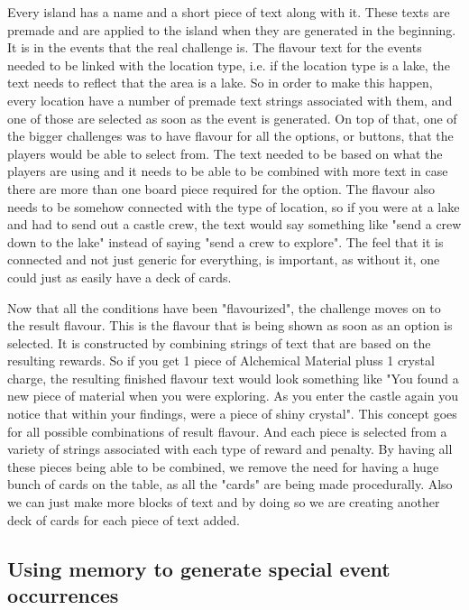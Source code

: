 Every island has a name and a short piece of text along with it. These texts are premade and are applied to the island when they are generated in the beginning. 
It is in the events that the real challenge is. The flavour text for the events needed to be linked with the location type, i.e. if the location type is a lake, the text needs to reflect that the area is a lake. So in order to make this happen, every location have a number of premade text strings associated with them, and one of those are selected as soon as the event is generated. On top of that, one of the bigger challenges was to have flavour for all the options, or buttons, that the players would be able to select from. The text needed to be based on what the players are using and it needs to be able to be combined with more text in case there are more than one board piece required for the option. The flavour also needs to be somehow connected with the type of location, so if you were at a lake and had to send out a castle crew, the text would say something like "send a crew down to the lake" instead of saying "send a crew to explore". The feel that it is connected and not just generic for everything, is important, as without it, one could just as easily have a deck of cards. 

Now that all the conditions have been "flavourized", the challenge moves on to the result flavour. This is the flavour that is being shown as soon as an option is selected. It is constructed by combining strings of text that are based on the resulting rewards. So if you get 1 piece of Alchemical Material pluss 1 crystal charge, the resulting finished flavour text would look something like "You found a new piece of material when you were exploring. As you enter the castle again you notice that within your findings, were a piece of shiny crystal". 
This concept goes for all possible combinations of result flavour. And each piece is selected from a variety of strings associated with each type of reward and penalty. By having all these pieces being able to be combined, we remove the need for having a huge bunch of cards on the table, as all the "cards" are being made procedurally. Also we can just make more blocks of text and by doing so we are creating another deck of cards for each piece of text added.


\subsection{Using memory to generate special event occurrences}

